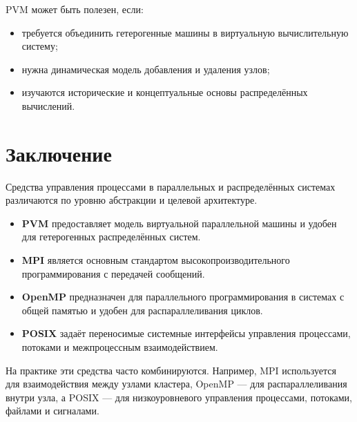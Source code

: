 \documentclass[12pt,a4paper]{article}
\begin{document}
PVM может быть полезен, если:
\begin{itemize}
    \item требуется объединить гетерогенные машины в виртуальную вычислительную систему;
    \item нужна динамическая модель добавления и удаления узлов;
    \item изучаются исторические и концептуальные основы распределённых вычислений.
\end{itemize}

\section{Заключение}

Средства управления процессами в параллельных и распределённых системах различаются по уровню абстракции и целевой архитектуре.

\begin{itemize}
    \item \textbf{PVM} предоставляет модель виртуальной параллельной машины и удобен для гетерогенных распределённых систем.
    \item \textbf{MPI} является основным стандартом высокопроизводительного программирования с передачей сообщений.
    \item \textbf{OpenMP} предназначен для параллельного программирования в системах с общей памятью и удобен для распараллеливания циклов.
    \item \textbf{POSIX} задаёт переносимые системные интерфейсы управления процессами, потоками и межпроцессным взаимодействием.
\end{itemize}

На практике эти средства часто комбинируются. Например, MPI используется для взаимодействия между узлами кластера, OpenMP --- для распараллеливания внутри узла, а POSIX --- для низкоуровневого управления процессами, потоками, файлами и сигналами.
\end{document}
